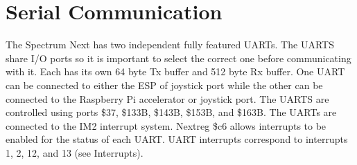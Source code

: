 \chapter{Serial Communication}

The Spectrum Next has two independent fully featured UARTs. The UARTS
share I/O ports so it is important to select the correct one before
communicating with it. Each has its own 64 byte Tx buffer and 512 byte
Rx buffer. One UART can be connected to either the ESP of joystick
port while the other can be connected to the Raspberry Pi accelerator
or joystick port. The UARTS are controlled using ports \$37, \$133B,
\$143B, \$153B, and \$163B. The UARTs are connected to the IM2
interrupt system.  Nextreg \$c6 allows interrupts to be enabled for
the status of each UART. UART interrupts correspond to interrupts 1,
2, 12, and 13 (see Interrupts).








